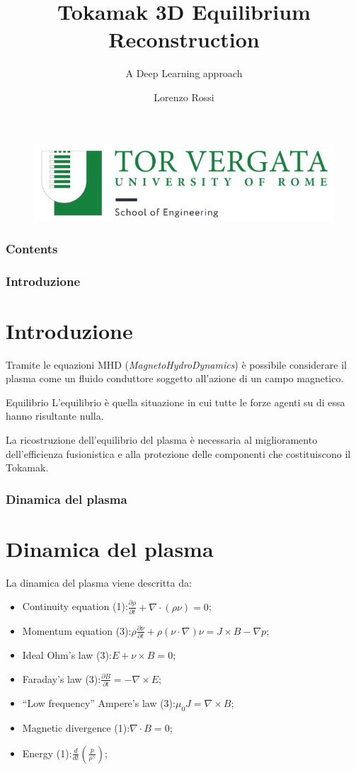 \documentclass{beamer}
\title{Tokamak 3D Equilibrium Reconstruction}
\subtitle{A Deep Learning approach}
\author{Lorenzo Rossi}
\institute{Università di Rome "Tor Vergata"} %
\begin{document}
\begin{frame}
	\titlepage{}
	\vspace{-1cm}
	\begin{figure}
		\centering
		\includegraphics[scale=0.3]{2022-06-06-23-17-53.png}%
	\end{figure}
\end{frame}
\begin{frame}
	\frametitle{Contents}
	\tableofcontents
\end{frame}
\begin{frame}
	\frametitle{Introduzione}
	\section{Introduzione}
	Tramite le equazioni MHD (\emph{MagnetoHydroDynamics}) è possibile considerare il plasma come un fluido conduttore soggetto all'azione di un campo magnetico.
	\begin{block}{Equilibrio}
		L'equilibrio è quella situazione in cui tutte le forze agenti su di essa hanno risultante nulla.
	\end{block}
	La ricostruzione dell'equilibrio del plasma è necessaria al miglioramento dell'efficienza fusionistica e alla protezione delle componenti che costituiscono il Tokamak.
\end{frame}
\begin{frame}
	\frametitle{Dinamica del plasma}
	\section{Dinamica del plasma}
	La dinamica del plasma viene descritta da:
	\begin{itemize}
		\item Continuity equation (1):\(\frac{\partial\rho}{\partial t}+\nabla\cdot(\rho \nu)=0\);
		\item Momentum equation (3):\(\rho \frac{\partial\nu}{\partial t}+\rho(\nu\cdot\nabla)\nu=J\times B-\nabla p\);
		\item Ideal Ohm's law (3):\(E+\nu\times B=0\);
		\item Faraday's law (3):\(\frac{\partial B}{\partial t}=-\nabla\times E\);%
		\item ``Low frequency'' Ampere's law (3):\(\mu_{0}J=\nabla\times B\);%
		\item Magnetic divergence (1):\(\nabla\cdot B=0\);
		\item Energy (1):\(\frac{d}{dt}(\frac{p}{\rho^{\gamma}})\);
	\end{itemize}
\end{frame}
\end{document}
